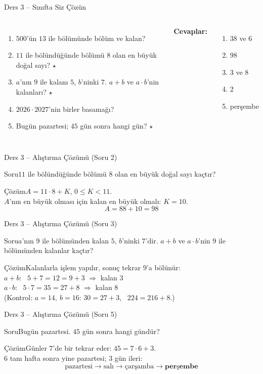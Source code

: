 \documentclass[aspectratio=169,11pt,handout]{beamer}
\newcommand{\soru}[3]{%
\begin{frame}{#1}
  \begin{block}{Soru}\large #2\end{block}
  \pause
  \begin{exampleblock}{Çözüm}\large #3\end{exampleblock}
\end{frame}}
\begin{document}
\begin{frame}{Ders 3 -- Sınıfta Siz Çözün}
\begin{columns}[t]
\begin{enumerate}
\item \(500\)'ün \(13\) ile bölümünde bölüm ve kalan?
\item \(11\) ile bölündüğünde bölümü \(8\) olan en büyük doğal sayı? \(\star\)
\item \(a\)'nın \(9\) ile kalanı \(5\), \(b\)'ninki \(7\). \(a+b\) ve \(a\cdot b\)'nin kalanları? \(\star\)
\item \(2026\cdot 2027\)'nin birler basamağı?
\item Bugün pazartesi; \(45\) gün sonra hangi gün? \(\star\)
\end{enumerate}
\pause
\textbf{Cevaplar:}
\begin{enumerate}
\item \(38\) ve \(6\)
\item \(98\)
\item \(3\) ve \(8\)
\item \(2\)
\item perşembe
\end{enumerate}
\end{columns}
\vspace{4pt}{\footnotesize \(\star\) işaretli soruların adım adım çözümü sonraki slaytlardadır.}
\end{frame}

\soru{Ders 3 -- Alıştırma Çözümü (Soru 2)}
{\(11\) ile bölündüğünde bölümü \(8\) olan en büyük doğal sayı kaçtır?}
{\(A=11\cdot 8+K\), \quad \(0\le K<11\).\\[3pt]
\(A\)'nın en büyük olması için kalan en büyük olmalı: \(K=10\).
\[A=88+10=98\]}

\soru{Ders 3 -- Alıştırma Çözümü (Soru 3)}
{\(a\)'nın \(9\) ile bölümünden kalan \(5\), \(b\)'ninki \(7\)'dir. \(a+b\) ve \(a\cdot b\)'nin \(9\) ile bölümünden kalanlar kaçtır?}
{Kalanlarla işlem yapılır, sonuç tekrar \(9\)'a bölünür:\\[3pt]
\(a+b\): \ \(5+7=12=9+3\) \(\Rightarrow\) kalan \(3\)\\[3pt]
\(a\cdot b\): \ \(5\cdot 7=35=27+8\) \(\Rightarrow\) kalan \(8\)\\[3pt]
(Kontrol: \(a=14,\ b=16\): \(30=27+3\), \ \(224=216+8\).)}

\soru{Ders 3 -- Alıştırma Çözümü (Soru 5)}
{Bugün pazartesi. \(45\) gün sonra hangi gündür?}
{Günler \(7\)'de bir tekrar eder: \(45=7\cdot 6+3\).\\[3pt]
\(6\) tam hafta sonra yine pazartesi; \(3\) gün ileri:
\[\text{pazartesi}\rightarrow\text{salı}\rightarrow\text{çarşamba}\rightarrow\textbf{perşembe}\]}
\end{document}
